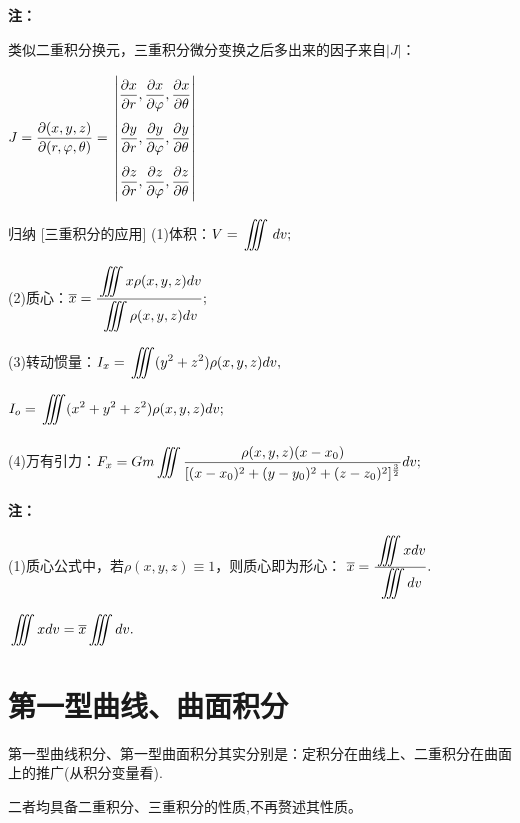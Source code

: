 \documentclass[a4paper,12pt,oneside,fontset=none]{ctexbook}
\let\olddfrac\dfrac
\renewcommand{\dfrac}[2]{
    \olddfrac{#1\vrule width 0pt height 1.15em depth 0em}{#2\vrule width 0pt height 0em depth 0.6em}
}
\let\oldiiint\iiint
\renewcommand{\iiint}{\displaystyle{\vrule width 0pt height 0em depth 0em}\oldiiint}
\newenvironment{induction}[1][]{\begin{thmBox}{归纳}{#1}}{\end{thmBox}}
\newenvironment{note}{
    \par\vspace{0.5em}\noindent
    \textbf{\color{NoteColor} 注：}
}{
    \par\vspace{0.5em}
}
\numberwithin{equation}{chapter}
\begin{document}
\begin{note}
类似二重积分换元，三重积分微分变换之后多出来的因子来自$|J|$：

$J = \dfrac{\partial(x,y,z)}{\partial(r,\varphi,\theta)} = $
    $\begin{vmatrix}
        \dfrac{\partial x}{\partial r}, \dfrac{\partial x}{\partial \varphi}, \dfrac{\partial x}{\partial \theta}\\
        \dfrac{\partial y}{\partial r}, \dfrac{\partial y}{\partial \varphi}, \dfrac{\partial y}{\partial \theta}\\
        \dfrac{\partial z}{\partial r}, \dfrac{\partial z}{\partial \varphi}, \dfrac{\partial z}{\partial \theta}
    \end{vmatrix}$
\end{note}

\begin{induction}
    [三重积分的应用]
    (1)体积：$V = \iiint \,dv;$

    (2)质心：$\overline{x} = \dfrac{\iiint x \rho(x,y,z)dv}{\iiint \rho(x,y,z)dv};$

    (3)转动惯量：$I_x = \iiint(y^2 + z^2)\rho(x,y,z)dv,$
    
    $I_o = \iiint(x^2 + y^2 + z^2)\rho(x,y,z)dv;$

    (4)万有引力：$F_x = Gm\iiint \dfrac{\rho(x,y,z)(x-x_0)}{[(x-x_0)^2+(y-y_0)^2+(z-z_0)^2]^{\frac{3}{2}}}dv;$

\end{induction}
\begin{note}
(1)质心公式中，若$\rho(x,y,z)\equiv 1$，则质心即为形心：
$\overline{x} = \frac{\iiint x dv}{\iiint dv}.$

$\iiint x dv = \overline{x} \iiint dv.$
\end{note}


\section{第一型曲线、曲面积分}
第一型曲线积分、第一型曲面积分其实分别是：定积分在曲线上、二重积分在曲面上的推广(从积分变量看).

二者均具备二重积分、三重积分的性质,不再赘述其性质。
\end{document}
